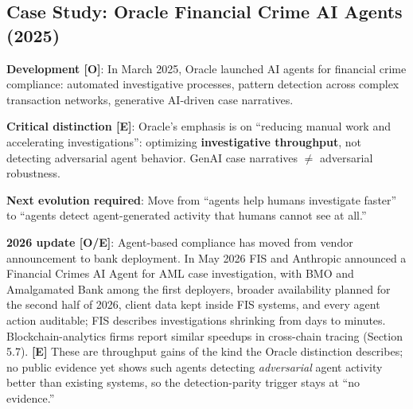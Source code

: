 \documentclass[11pt,letterpaper]{article}
\begin{document}
\subsection{Case Study: Oracle Financial Crime AI Agents (2025)}

\textbf{Development [O]}: In March 2025, Oracle launched AI agents for financial crime compliance: automated investigative processes, pattern detection across complex transaction networks, generative AI-driven case narratives.

\textbf{Critical distinction [E]}: Oracle's emphasis is on ``reducing manual work and accelerating investigations'': optimizing \textbf{investigative throughput}, not detecting adversarial agent behavior. GenAI case narratives $\neq$ adversarial robustness.

\textbf{Next evolution required}: Move from ``agents help humans investigate faster'' to ``agents detect agent-generated activity that humans cannot see at all.''

\textbf{2026 update [O/E]}: Agent-based compliance has moved from vendor announcement to bank deployment. In May 2026 FIS and Anthropic announced a Financial Crimes AI Agent for AML case investigation, with BMO and Amalgamated Bank among the first deployers, broader availability planned for the second half of 2026, client data kept inside FIS systems, and every agent action auditable; FIS describes investigations shrinking from days to minutes. Blockchain-analytics firms report similar speedups in cross-chain tracing (Section 5.7). \textbf{[E]} These are throughput gains of the kind the Oracle distinction describes; no public evidence yet shows such agents detecting \textit{adversarial} agent activity better than existing systems, so the detection-parity trigger stays at ``no evidence.''
\end{document}
